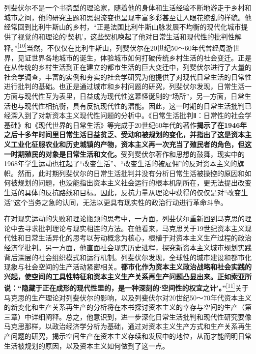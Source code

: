 \documentclass[UTF8, fontset = sourcesans, a4paper, oneside, zihao =
-4, scheme=chinese, no-math, space=true]{ctexbook}
\begin{document}
列斐伏尔不是一个书斋型的理论家，随着他的身体和生活经验不断地游走于乡村和城市之间，他的研究主题和思想流变也呈现丰富多彩甚至让人眼花缭乱的样貌。他经常回到比利牛斯山的乡村，``正是法国比利牛斯山脉发展不均衡的现代化城市提供了视觉的和理论的`契机'，这些契机唤起了他对日常生活和现代性的批判性解释。''\protect\hypertarget{part0005_split_001.htmlux5cux23w10}{}{}\protect\hyperlink{part0005_split_003.htmlux5cux23m10}{\textsuperscript{{[}10{]}}}当然，不仅仅在比利牛斯山，列斐伏尔在20世纪50～60年代曾经周游世界，见证世界各地城市的诞生，体验城市如何打破传统乡村生活的社会变迁。正是在从传统的乡村生活到正在建立的都市生活的巨大变迁中，列斐伏尔进行了大量的社会学调查，丰富的实例和夯实的社会学研究为他提供了对现代日常生活的日常性进行批判的基础。也正是通过城市和乡村问题的研究，列斐伏尔发现，日常生活一方面与现代性互为表里，日益成为现代性这幕怪诞剧的``场所''，另一方面，日常生活也与现代性相抗衡，具有反抗现代性的潜能。因此，这一时期的日常生活批判已经深入到了对新资本主义现代性问题的分析中。《日常生活批判Ⅱ：日常性的社会学基础》和《现代世界的日常生活》等完成于20世纪60年代的著作\textbf{揭示了在1946年之后十多年时间里日常生活日益贫乏、受动和被规划的变化，并指出了这是资本主义工业化征服农业和历史城镇的产物，资本主义再一次充当了殖民者的角色，但这一时期殖民的对象是日常生活和文化。}受列斐伏尔著作和思想的鼓舞，现实中的1968年学生运动也扛起了``改变生活''、``改变生活的被雇佣''的反对资本主义的旗帜。然而，此时期列斐伏尔的日常生活批判并没有分析日常生活被操控的原因和如何被规划的问题，也没能指出资本主义社会运行的根本机制所在，更无法提出改变生活的具体的反抗路线和目标。因此，反抗力量从理论中获得的仅仅是对``改变生活''这个当务之急的认同，无法以更具有现实性的政治行动进行革命斗争。

在对现实运动的失败和理论瓶颈的思考中，一方面，列斐伏尔重新回到马克思的理论中去寻求批判理论与现实相连的方法。在他看来，马克思关于19世纪资本主义现代性和日常生活异化的思考以劳动概念为核心，根植于对资本主义生产过程的政治经济学批判。另一方面，他直面社会现实历史进程，探究新资本主义城市规划实践背后深层的社会组织模式和运行机制。列斐伏尔发现，全球性的城市建设和都市化现象与社会空间的生产活动紧密相关。\textbf{都市化作为资本主义政治战略和社会实践的兴起，使空间的工具性特征和资本主义生产关系再生产问题凸显出来。正如索亚所说：``隐藏于正在成形的现代性里的，是一种深刻的`空间性的权宜之计'。''}\protect\hypertarget{part0005_split_001.htmlux5cux23w11}{}{}\protect\hyperlink{part0005_split_003.htmlux5cux23m11}{\textsuperscript{{[}11{]}}}关于马克思的生产理论对列斐伏尔的影响，以及列斐伏尔对20世纪50～70年代资本主义的新变化和生产关系再生产的分析将在本书探讨资本主义的幸存与空间的生产（第三章）中详细阐释。总之，他意识到，进一步深化日常生活批判和现代性研究要像马克思那样，以政治经济学分析为基础，通过对资本主义生产方式和生产关系再生产问题的研究，揭示空间生产在资本主义存续和发展中的地位，从而才能阐明日常生活被规划的原因，以及资本主义如何做到了这一点。
\end{document}
